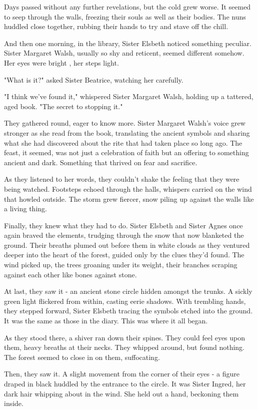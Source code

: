 \documentclass[11pt]{article}
\begin{document}
Days passed without any further revelations, but the cold grew worse. It seemed to seep through the walls, freezing their souls as well as their bodies. The nuns huddled close together, rubbing their hands to try and stave off the chill.

And then one morning, in the library, Sister Elsbeth noticed something peculiar. Sister Margaret Walsh, usually so shy and reticent, seemed different somehow. Her eyes were bright , her steps light. 

"What is it?" asked Sister Beatrice, watching her carefully.

"I think we've found it," whispered Sister Margaret Walsh, holding up a tattered, aged book. "The secret to stopping it."

They gathered round, eager to know more. Sister Margaret Walsh's voice grew stronger as she read from the book, translating the ancient symbols and sharing what she had discovered about the rite that had taken place so long ago. The feast, it seemed, was not just a celebration of faith but an offering to something ancient and dark. Something that thrived on fear and sacrifice.

As they listened to her words, they couldn't shake the feeling that they were being watched. Footsteps echoed through the halls, whispers carried on the wind that howled outside. The storm grew fiercer, snow piling up against the walls like a living thing.

Finally, they knew what they had to do. Sister Elsbeth and Sister Agnes once again braved the elements, trudging through the snow that now blanketed the ground. Their breaths plumed out before them in white clouds as they ventured deeper into the heart of the forest, guided only by the clues they'd found. The wind picked up, the trees groaning under its weight, their branches scraping against each other like bones against stone.

At last, they saw it - an ancient stone circle hidden amongst the trunks. A sickly green light flickered from within, casting eerie shadows. With trembling hands, they stepped forward, Sister Elsbeth tracing the symbols etched into the ground. It was the same as those in the diary. This was where it all began.

As they stood there, a shiver ran down their spines. They could feel eyes upon them, heavy breaths at their necks. They whipped around, but found nothing. The forest seemed to close in on them, suffocating.

Then, they saw it. A slight movement from the corner of their eyes - a figure draped in black huddled by the entrance to the circle. It was Sister Ingred, her dark hair whipping about in the wind. She held out a hand, beckoning them inside.
\end{document}
